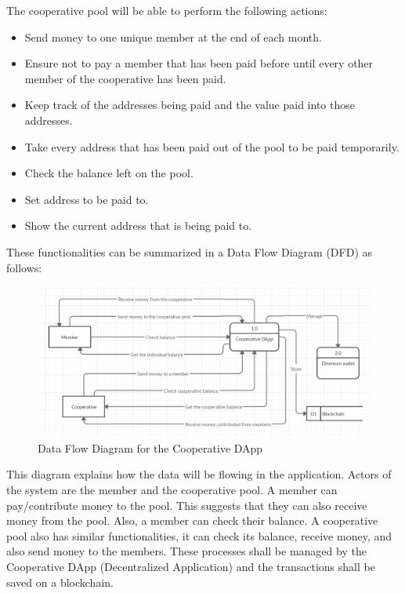 \documentclass{article}
\begin{document}
\begin{flushleft}
The cooperative pool will be able to perform the following actions:
\begin{itemize}
    \item Send money to one unique member at the end of each month.
    \item Ensure not to pay a member that has been paid before until every other member of the cooperative has been paid.
    \item Keep track of the addresses being paid and the value paid into those addresses.
    \item Take every address that has been paid out of the pool to be paid temporarily.
    \item Check the balance left on the pool.
    \item Set address to be paid to.
    \item Show the current address that is being paid to.
\end{itemize}

These functionalities can be summarized in a Data Flow Diagram (DFD) as follows:

\begin{figure}[H]
\centering
\includegraphics[scale=0.6]{DFD.PNG}
\caption{Data Flow Diagram for the Cooperative DApp}
\label{fig:dessign}
\end{figure}

This diagram explains how the data will be flowing in the application. Actors of the system are the member and the cooperative pool. A member can pay/contribute money to the pool. This suggests that they can also receive money from the pool. Also, a member can check their balance. A cooperative pool also has similar functionalities, it can check its balance, receive money, and also send money to the members. These processes shall be managed by the Cooperative DApp (Decentralized Application) and the transactions shall be saved on a blockchain.


\end{flushleft}
\end{document}
